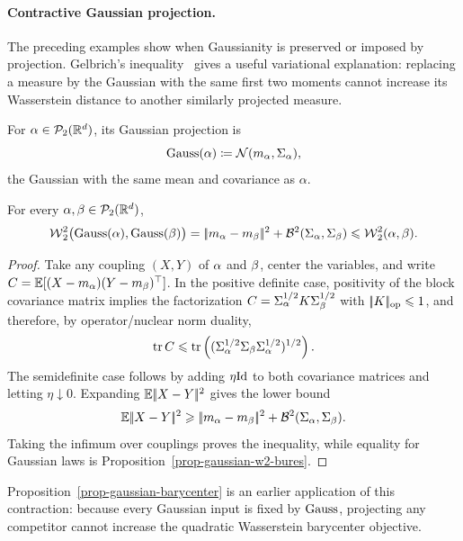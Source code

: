 \paragraph{Contractive Gaussian projection.}

The preceding examples show when Gaussianity is preserved or imposed by projection. Gelbrich's inequality~\cite{gelbrich1990formula} gives a useful variational explanation: replacing a measure by the Gaussian with the same first two moments cannot increase its Wasserstein distance to another similarly projected measure.

\begin{defn}\label{def-gaussian-projection}
For \(\alpha\in\mathcal{P}_2(\mathbb{R}^d)\), its Gaussian projection is
\[
	\operatorname{Gauss}(\alpha)
	\coloneqq
	\mathcal{N}(m_\alpha,\Sigma_\alpha),
\]
the Gaussian with the same mean and covariance as \(\alpha\).
\end{defn}

\begin{thm}\label{thm-gelbrich-projection}
	For every $\alpha,\beta\in\mathcal{P}_2(\mathbb{R}^d)$,
	\[
		\operatorname{\mathcal{W}}_2^2\bigl(\operatorname{Gauss}(\alpha),\operatorname{Gauss}(\beta)\bigr)
		=
		|\!| m_\alpha-m_\beta |\!|^2+\mathcal{B}^2(\Sigma_\alpha,\Sigma_\beta)
		\leqslant
		\operatorname{\mathcal{W}}_2^2(\alpha,\beta).
	\]
\end{thm}

\begin{proof}
	Take any coupling $(X,Y)$ of $\alpha$ and $\beta$, center the variables, and write $C=\mathbb{E}[(X-m_\alpha)(Y-m_\beta)^\top]$. In the positive definite case, positivity of the block covariance matrix implies the factorization $C=\Sigma_\alpha^{1/2}K\Sigma_\beta^{1/2}$ with $|\!| K |\!|_{\mathrm{op}}\leqslant1$, and therefore, by operator/nuclear norm duality,
	\[
		\operatorname{tr} C\leqslant \operatorname{tr}\left((\Sigma_\alpha^{1/2}\Sigma_\beta\Sigma_\alpha^{1/2})^{1/2}\right).
	\]
	The semidefinite case follows by adding $\eta\mathrm{Id}$ to both covariance matrices and letting $\eta\downarrow0$.
	Expanding $\mathbb{E}|\!| X-Y |\!|^2$ gives the lower bound
	\[
		\mathbb{E}|\!| X-Y |\!|^2
		\geqslant
		|\!| m_\alpha-m_\beta |\!|^2+\mathcal{B}^2(\Sigma_\alpha,\Sigma_\beta).
	\]
	Taking the infimum over couplings proves the inequality, while equality for Gaussian laws is Proposition~\ref{prop-gaussian-w2-bures}.
\end{proof}

Proposition~\ref{prop-gaussian-barycenter} is an earlier application of this contraction: because every Gaussian input is fixed by $\operatorname{Gauss}$, projecting any competitor cannot increase the quadratic Wasserstein barycenter objective.

